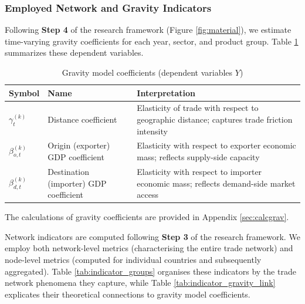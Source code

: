 \documentclass[preprint, 3p,
authoryear]{elsarticle} %
\begin{document}
\subsubsection{Employed Network and Gravity
Indicators}\label{employed-network-and-gravity-indicators}

Following \textbf{Step 4} of the research framework (Figure
\ref{fig:material}), we estimate time-varying gravity coefficients for
each year, sector, and product group. Table
\ref{tab:gravity_coefficients} summarizes these dependent variables.

\begin{table}[H]
\centering
\caption{Gravity model coefficients (dependent variables $Y$)}
\label{tab:gravity_coefficients}
\begin{tabular}{@{}llp{7cm}@{}}
\toprule
\textbf{Symbol} & \textbf{Name} & \textbf{Interpretation} \\
\midrule
$\gamma_t^{(k)}$ & Distance coefficient & Elasticity of trade with respect to geographic distance; captures trade friction intensity \\
$\beta_{o,t}^{(k)}$ & Origin (exporter) GDP coefficient & Elasticity with respect to exporter economic mass; reflects supply-side capacity \\
$\beta_{d,t}^{(k)}$ & Destination (importer) GDP coefficient & Elasticity with respect to importer economic mass; reflects demand-side market access \\
\bottomrule
\end{tabular}
\end{table}

The calculations of gravity coefficients are provided in Appendix
\ref{sec:calcgrav}.

Network indicators are computed following \textbf{Step 3} of the
research framework. We employ both network-level metrics (characterising
the entire trade network) and node-level metrics (computed for
individual countries and subsequently aggregated). Table
\ref{tab:indicator_groups} organises these indicators by the trade
network phenomena they capture, while Table
\ref{tab:indicator_gravity_link} explicates their theoretical
connections to gravity model coefficients.
\end{document}
